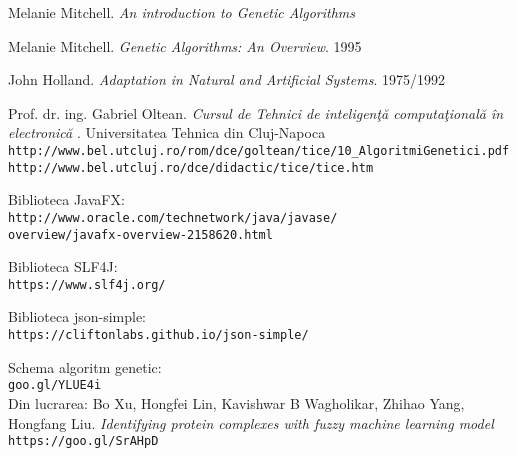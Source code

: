 \begin{thebibliography}{99}

Melanie Mitchell.
\textit{An introduction to Genetic Algorithms}

Melanie Mitchell. 
\textit{Genetic Algorithms: An Overview}. 1995

John Holland. 
\textit{Adaptation in Natural and Artificial Systems}. 1975/1992

Prof. dr. ing. Gabriel Oltean.
\textit{Cursul de Tehnici de inteligenţă computaţională în electronică}
. Universitatea Tehnica din Cluj-Napoca
\\\texttt{http://www.bel.utcluj.ro/rom/dce/goltean/tice/10\_AlgoritmiGenetici.pdf}
\\\texttt{http://www.bel.utcluj.ro/dce/didactic/tice/tice.htm}

Biblioteca JavaFX:\\
\texttt{http://www.oracle.com/technetwork/java/javase/}\\
\texttt{overview/javafx-overview-2158620.html}

Biblioteca SLF4J:\\
\texttt{https://www.slf4j.org/}

Biblioteca json-simple:\\
\texttt{https://cliftonlabs.github.io/json-simple/}

Schema algoritm genetic:
\\\texttt{goo.gl/YLUE4i}\\
Din lucrarea: Bo Xu, Hongfei Lin, Kavishwar B Wagholikar, Zhihao Yang, Hongfang Liu. \textit{Identifying protein complexes with fuzzy machine learning model}
\\\texttt{https://goo.gl/SrAHpD} 
\end{thebibliography}